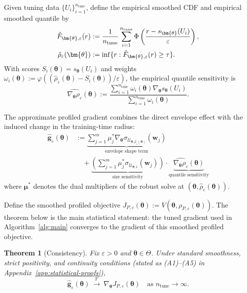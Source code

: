 \documentclass[11pt]{article}
\newcommand{\Prob}{\mathbb{P}}
\newcommand{\cU}{\mathcal{U}}
\newcommand{\btheta}{\bm{\theta}}
\newcommand{\bmu}{\bm{\mu}}
\newcommand{\bw}{\bm{w}}
\newcommand{\bg}{\bm{g}}
\newtheorem{theorem}{Theorem}
\theoremstyle{definition}
\begin{document}
Given tuning data $\{U_i\}_{i=1}^{n_{\text{tune}}}$, define the empirical smoothed CDF and empirical smoothed quantile by
\begin{align}
\hat F_{\btheta,\varepsilon}(r) &:= \frac{1}{n_{\text{tune}}}\sum_{i=1}^{n_{\text{tune}}}\Phi\left(\frac{r - s_{\btheta}(U_i)}{\varepsilon}\right), \notag\\
\hat{\rho}_\varepsilon(\btheta) &:= \inf\{r : \hat F_{\btheta,\varepsilon}(r) \geq \tau\}. \label{eq:emp-smoothed-quantile}
\end{align}
With scores $S_i(\btheta) = s_{\btheta}(U_i)$ and weights $\omega_i(\btheta) := \varphi((\hat{\rho}_\varepsilon(\btheta) - S_i(\btheta))/\varepsilon)$, the empirical quantile sensitivity is
\begin{equation}\label{eq:rhohat-grad}
\widehat{\nabla_{\btheta} \rho_\varepsilon}(\btheta) := \frac{\sum_{i=1}^{n_{\text{tune}}} \omega_i(\btheta) \nabla_{\btheta} s_{\btheta}(U_i)}{\sum_{i=1}^{n_{\text{tune}}} \omega_i(\btheta)}.
\end{equation}

The approximate profiled gradient combines the direct envelope effect with the induced change in the training-time radius:
\begin{equation}\label{eq:ghat}
\boxed{
\begin{aligned}
\hat{\bg}_\varepsilon(\btheta) &:= \underbrace{\sum_{j=1}^m \mu_j^* \nabla_{\btheta} \sigma_{\cU_{\btheta,\hat{\rho}_\varepsilon(\btheta)}}(\bw_j)}_{\text{envelope shape term}} \\
&\quad + \underbrace{\left(\sum_{j=1}^m \mu_j^* \sigma_{\cU_{\btheta,1}}(\bw_j)\right)}_{\text{size sensitivity}} \cdot \underbrace{\widehat{\nabla_{\btheta} \rho_\varepsilon}(\btheta)}_{\text{quantile sensitivity}}
\end{aligned}
}
\end{equation}
where $\bmu^*$ denotes the dual multipliers of the robust solve at $(\btheta,\hat{\rho}_\varepsilon(\btheta))$.

Define the smoothed profiled objective $J_{P,\varepsilon}(\btheta):=V(\btheta,\rho_{P,\varepsilon}(\btheta))$. The theorem below is the main statistical statement: the tuned gradient used in Algorithm~\ref{alg:main} converges to the gradient of this smoothed profiled objective.

\begin{theorem}[Consistency]\label{thm:consistency-eps}
Fix $\varepsilon>0$ and $\btheta\in\Theta$. Under standard smoothness, strict positivity, and continuity conditions (stated as (A1)--(A5) in Appendix~\ref{app:statistical-proofs}),
\[
\hat{\bg}_\varepsilon(\btheta)\ \xrightarrow{\ \Prob\ }\ \nabla_{\btheta}J_{P,\varepsilon}(\btheta) \quad \text{as } n_{\mathrm{tune}}\to\infty.
\]
\end{theorem}
\end{document}
